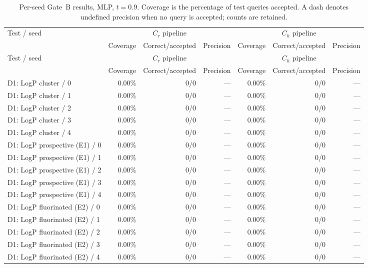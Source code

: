 \begin{longtable}{@{}lrrrrrr@{}}
\caption{Per-seed Gate~B results, MLP, $t=0.9$. Coverage is the percentage of test queries accepted. A dash denotes undefined precision when no query is accepted; counts are retained.}\\
\toprule
Test / seed & \multicolumn{3}{c}{$C_r$ pipeline} & \multicolumn{3}{c}{$C_h$ pipeline} \\
 & Coverage & Correct/accepted & Precision & Coverage & Correct/accepted & Precision \\
\midrule
\endfirsthead
\toprule
Test / seed & \multicolumn{3}{c}{$C_r$ pipeline} & \multicolumn{3}{c}{$C_h$ pipeline} \\
 & Coverage & Correct/accepted & Precision & Coverage & Correct/accepted & Precision \\
\midrule
\endhead
\bottomrule
\endfoot
D1: LogP cluster / 0 & 0.00\% & 0/0 & --- & 0.00\% & 0/0 & --- \\
D1: LogP cluster / 1 & 0.00\% & 0/0 & --- & 0.00\% & 0/0 & --- \\
D1: LogP cluster / 2 & 0.00\% & 0/0 & --- & 0.00\% & 0/0 & --- \\
D1: LogP cluster / 3 & 0.00\% & 0/0 & --- & 0.00\% & 0/0 & --- \\
D1: LogP cluster / 4 & 0.00\% & 0/0 & --- & 0.00\% & 0/0 & --- \\
\addlinespace
D1: LogP prospective (E1) / 0 & 0.00\% & 0/0 & --- & 0.00\% & 0/0 & --- \\
D1: LogP prospective (E1) / 1 & 0.00\% & 0/0 & --- & 0.00\% & 0/0 & --- \\
D1: LogP prospective (E1) / 2 & 0.00\% & 0/0 & --- & 0.00\% & 0/0 & --- \\
D1: LogP prospective (E1) / 3 & 0.00\% & 0/0 & --- & 0.00\% & 0/0 & --- \\
D1: LogP prospective (E1) / 4 & 0.00\% & 0/0 & --- & 0.00\% & 0/0 & --- \\
\addlinespace
D1: LogP fluorinated (E2) / 0 & 0.00\% & 0/0 & --- & 0.00\% & 0/0 & --- \\
D1: LogP fluorinated (E2) / 1 & 0.00\% & 0/0 & --- & 0.00\% & 0/0 & --- \\
D1: LogP fluorinated (E2) / 2 & 0.00\% & 0/0 & --- & 0.00\% & 0/0 & --- \\
D1: LogP fluorinated (E2) / 3 & 0.00\% & 0/0 & --- & 0.00\% & 0/0 & --- \\
D1: LogP fluorinated (E2) / 4 & 0.00\% & 0/0 & --- & 0.00\% & 0/0 & --- \\

\end{longtable}
